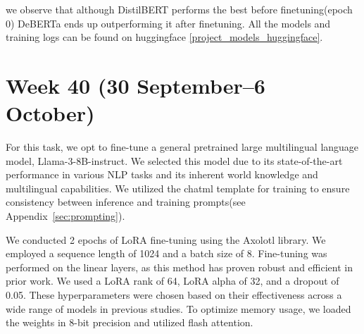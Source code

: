 \documentclass[11pt]{article}
\begin{document}
\begin{table}[ht]
    \centering
    \caption{Evaluation during fine-tuning of DeBERTa-V3}
    \label{tab:evaluation_metrics}
\end{table}

we observe that although DistilBERT performs the best before finetuning(epoch 0) DeBERTa ends up outperforming it after finetuning. 
All the models and training logs can be found on huggingface \ref{project_models_huggingface}.

\section{Week 40 (30 September--6 October)}
\label{sec:week40}

For this task, we opt to fine-tune a general pretrained large multilingual language model, Llama-3-8B-instruct. 
We selected this model due to its state-of-the-art performance in various NLP tasks and its inherent world knowledge and multilingual capabilities.
We utilized the chatml template for training to ensure consistency between inference and training prompts(see Appendix~\vref{sec:prompting}).

We conducted 2 epochs of LoRA fine-tuning \cite{hu2021loralowrankadaptationlarge} using the Axolotl library. 
We employed a sequence length of 1024 and a batch size of 8. 
Fine-tuning was performed on the linear layers, as this method has proven robust and efficient in prior work.
We used a LoRA rank of 64, LoRA alpha of 32, and a dropout of 0.05. 
These hyperparameters were chosen based on their effectiveness across a wide range of models in previous studies.
To optimize memory usage, we loaded the weights in 8-bit precision and utilized flash attention.
\end{document}
